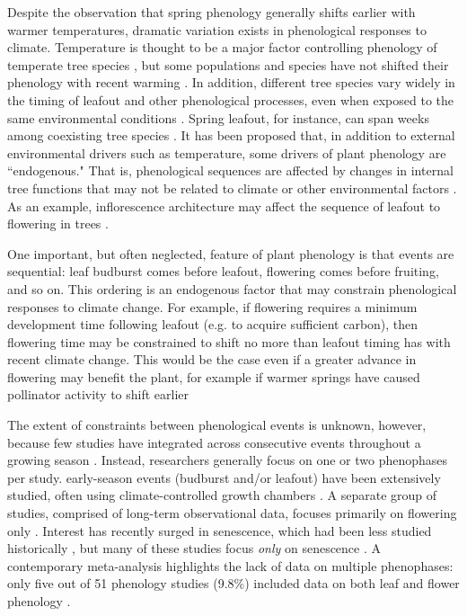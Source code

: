 \documentclass{article}
\begin{document}
\par Despite the observation that spring phenology generally shifts earlier with warmer temperatures, dramatic variation exists in phenological responses to climate. Temperature is thought to be a major factor controlling phenology of temperate tree species \citep{parmesan2006,richardson2006,morin2010,schwartz2013,clark2014b}, but some populations and species have not shifted their phenology with recent warming \citep{wolkovich2012}. In addition, different tree species vary widely in the timing of leafout and other phenological processes, even when exposed to the same environmental conditions \citep{lechowicz1984,primack2009c}. Spring leafout, for instance, can span weeks among coexisting tree species \citep{lechowicz1984}. It has been proposed that, in addition to external environmental drivers such as temperature, some drivers of plant phenology are ``endogenous." That is, phenological sequences are affected by changes in internal tree functions that may not be related to climate or other environmental factors \citep{borchert1992,marco2002}. As an example, inflorescence architecture may affect the sequence of leafout to flowering in trees \citep{marco2002}. 

\par One important, but often neglected, feature of plant phenology is that events are sequential: leaf budburst comes before leafout, flowering comes before fruiting, and so on. This ordering is an endogenous factor that may constrain phenological responses to climate change. For example, if flowering requires a minimum development time following leafout (e.g. to acquire sufficient carbon), then flowering time may be constrained to shift no more than leafout timing has with recent climate change. This would be the case even if a greater advance in flowering may benefit the plant, for example if warmer springs have caused pollinator activity to shift earlier \citep{polgar2013, thackeray2010}

\par The extent of constraints between phenological events is unknown, however, because few studies have integrated across consecutive events throughout a growing season \citep{wolkovich2014}. Instead, researchers generally focus on one or two phenophases per study. early-season events (budburst and/or leafout) have been extensively studied, often using climate-controlled growth chambers \citep[e.g.,][]{basler2012,laube2014}. A separate group of studies, comprised of long-term observational data, focuses primarily on flowering only \citep[e.g.,] []{fitter2002,millerrushing2008}. Interest has recently surged in senescence, which had been less studied historically \citep {parmesan2006}, but many of these studies focus \textit{only} on senescence \citep[e.g.,][]{taylor2008,archetti2013,jeong2014}. A contemporary meta-analysis highlights the lack of data on multiple phenophases: only five out of 51 phenology studies (9.8\%) included data on both leaf and flower phenology \citep{wolkovich2012}. 
\end{document}
